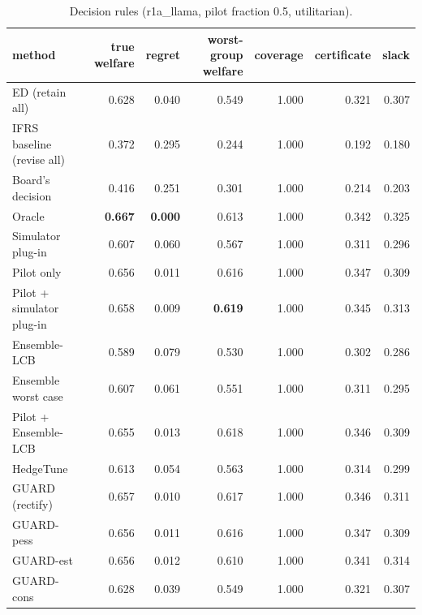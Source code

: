 \begin{table}[t]
\centering
\small
\begin{tabular}{lrrrrrr}
\toprule
method & true welfare & regret & worst-group welfare & coverage & certificate & slack \\
\midrule
ED (retain all) & 0.628 & 0.040 & 0.549 & 1.000 & 0.321 & 0.307 \\
IFRS baseline (revise all) & 0.372 & 0.295 & 0.244 & 1.000 & 0.192 & 0.180 \\
Board's decision & 0.416 & 0.251 & 0.301 & 1.000 & 0.214 & 0.203 \\
Oracle & \textbf{0.667} & \textbf{0.000} & 0.613 & 1.000 & 0.342 & 0.325 \\
Simulator plug-in & 0.607 & 0.060 & 0.567 & 1.000 & 0.311 & 0.296 \\
Pilot only & 0.656 & 0.011 & 0.616 & 1.000 & 0.347 & 0.309 \\
Pilot + simulator plug-in & 0.658 & 0.009 & \textbf{0.619} & 1.000 & 0.345 & 0.313 \\
Ensemble-LCB & 0.589 & 0.079 & 0.530 & 1.000 & 0.302 & 0.286 \\
Ensemble worst case & 0.607 & 0.061 & 0.551 & 1.000 & 0.311 & 0.295 \\
Pilot + Ensemble-LCB & 0.655 & 0.013 & 0.618 & 1.000 & 0.346 & 0.309 \\
HedgeTune & 0.613 & 0.054 & 0.563 & 1.000 & 0.314 & 0.299 \\
GUARD (rectify) & 0.657 & 0.010 & 0.617 & 1.000 & 0.346 & 0.311 \\
GUARD-pess & 0.656 & 0.011 & 0.616 & 1.000 & 0.347 & 0.309 \\
GUARD-est & 0.656 & 0.012 & 0.610 & 1.000 & 0.341 & 0.314 \\
GUARD-cons & 0.628 & 0.039 & 0.549 & 1.000 & 0.321 & 0.307 \\
\bottomrule
\end{tabular}
\caption{Decision rules (r1a\_llama, pilot fraction 0.5, utilitarian).}
\label{tab:methods-utilitarian}
\end{table}
